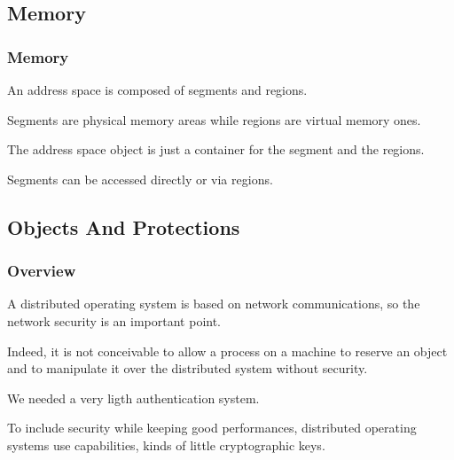 \documentclass[8pt]{beamer}
\newcommand{\nl}[0]{\vspace{0.4cm}}
\begin{document}
%
%

\subsection{Memory}


\begin{frame}
  \frametitle{Memory}

  An address space is composed of segments and regions.

  \nl

  Segments are physical memory areas while regions are virtual memory
  ones.

  \nl

  The address space object is just a container for the segment and
  the regions.

  \nl

  Segments can be accessed directly or via regions.
\end{frame}

%
%

\subsection{Objects And Protections}


\begin{frame}
  \frametitle{Overview}

  A distributed operating system is based on network communications, so
  the network security is an important point.

  \nl

  Indeed, it is not conceivable to allow a process on a machine
  to reserve an object and to manipulate it over the distributed
  system without security.

  \nl

  We needed a very ligth authentication system.

  \nl

  To include security while keeping good performances, distributed
  operating systems use capabilities, kinds of little cryptographic keys.
\end{frame}

\end{document}
